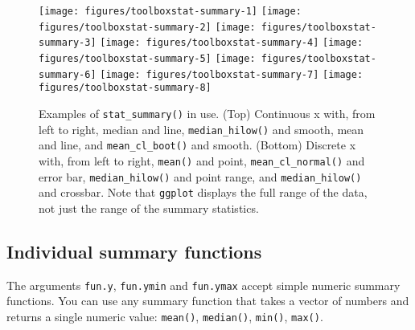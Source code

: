\begin{figure}

{\centering \texttt{[image: figures/toolboxstat-summary-1]} \texttt{[image: figures/toolboxstat-summary-2]} \texttt{[image: figures/toolboxstat-summary-3]} \texttt{[image: figures/toolboxstat-summary-4]} \texttt{[image: figures/toolboxstat-summary-5]} \texttt{[image: figures/toolboxstat-summary-6]} \texttt{[image: figures/toolboxstat-summary-7]} \texttt{[image: figures/toolboxstat-summary-8]} 

}

\caption{Examples of \texttt{stat\_summary()} in use. (Top) Continuous x with, from left to right, median and line, \texttt{median\_hilow()} and smooth, mean and line, and \texttt{mean\_cl\_boot()} and smooth. (Bottom) Discrete x with, from left to right, \texttt{mean()} and point, \texttt{mean\_cl\_normal()} and error bar, \texttt{median\_hilow()} and point range, and \texttt{median\_hilow()} and crossbar. Note that \texttt{ggplot} displays the full range of the data, not just the range of the summary statistics.\label{fig:stat-summary}}
\end{figure}

\subsection{Individual summary functions}

The arguments \texttt{fun.y}, \texttt{fun.ymin} and \texttt{fun.ymax}
accept simple numeric summary functions. You can use any summary
function that takes a vector of numbers and returns a single numeric
value: \texttt{mean()}, \texttt{median()}, \texttt{min()},
\texttt{max()}.

\begin{Shaded}
\begin{Highlighting}[]
\NormalTok{>}\StringTok{ }\StringTok{ } \NormalTok{)}
\NormalTok{>}\StringTok{ }\StringTok{ }
\NormalTok{+}\StringTok{   }\NormalTok{(}\NormalTok{(} \NormalTok{), } 
\NormalTok{+}\StringTok{     } \NormalTok{) +}
\NormalTok{+}\StringTok{   }\NormalTok{(}\NormalTok{(} \NormalTok{), } 
\NormalTok{+}\StringTok{     } \NormalTok{) +}\StringTok{ }
\NormalTok{+}\StringTok{   }\NormalTok{(}\NormalTok{)}
\end{Highlighting}
\end{Shaded}

